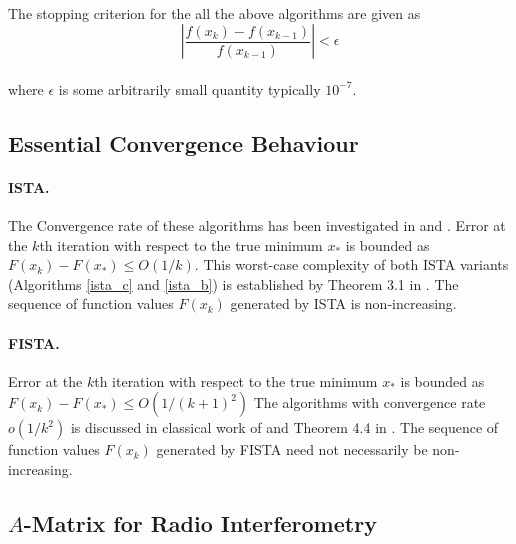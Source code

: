 \paragraph{}The stopping criterion for the all the above algorithms are given as
\begin{equation}
 \left| \frac{ f( x_k ) -f( x_{k-1} )} {f(x_{k-1})} \right| < \epsilon
\label{stopping}
\end{equation}
\paragraph{}where $\epsilon$ is some arbitrarily small quantity typically $10^{-7}$.


\subsection{Essential Convergence Behaviour}
\label{s:algorithms_convergence}

 \paragraph{ISTA.}
The Convergence rate of these algorithms has been investigated in \cite{fista} and \cite{guler}.
 Error at the $k$th iteration with respect to the true minimum $x_*$ is bounded as
 $
  F(x_k) - F(x_*) \le O\left(1 / k\right).
 $
 This worst-case complexity of both ISTA variants (Algorithms \ref{ista_c} and \ref{ista_b})
 is established by Theorem 3.1 in \cite{fista}.
The sequence of function values $F(x_k)$ generated by ISTA is non-increasing.
 \paragraph{FISTA.}
 Error at the $k$th iteration with respect to the true minimum $x_*$ is bounded as
 $
  F(x_k) - F(x_*) \le O\left(1 / ( k + 1 )^2\right)
 $
The algorithms with convergence rate $o(1/k^2)$ is discussed in classical work of \cite{nestrov} and
Theorem 4.4 in \cite{fista}.
The sequence of function values $F(x_k)$ generated by FISTA need not necessarily be non-increasing.

\subsection{$A$-Matrix for Radio Interferometry}
\label{s:algorithms_amatrix}
